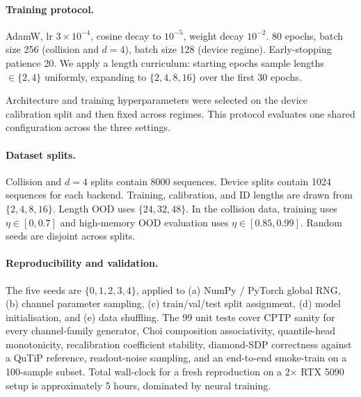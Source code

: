 \documentclass[12pt]{iopart}
\begin{document}
\paragraph*{Training protocol.}
AdamW, lr $3 \times 10^{-4}$, cosine decay to $10^{-5}$, weight decay $10^{-2}$. 80 epochs, batch size 256 (collision and $d{=}4$), batch size 128 (device regime). Early-stopping patience 20. We apply a length curriculum: starting epochs sample lengths $\in \{2, 4\}$ uniformly, expanding to $\{2, 4, 8, 16\}$ over the first 30 epochs.

Architecture and training hyperparameters were selected on the device calibration split and then fixed across regimes. This protocol evaluates one shared configuration across the three settings.

\paragraph*{Dataset splits.}
Collision and $d=4$ splits contain 8000 sequences. Device splits contain 1024 sequences for each backend. Training, calibration, and ID lengths are drawn from $\{2,4,8,16\}$. Length OOD uses $\{24,32,48\}$. In the collision data, training uses $\eta\in[0,0.7]$ and high-memory OOD evaluation uses $\eta\in[0.85,0.99]$. Random seeds are disjoint across splits.

\paragraph*{Reproducibility and validation.}
The five seeds are $\{0, 1, 2, 3, 4\}$, applied to (a) NumPy / PyTorch global RNG, (b) channel parameter sampling, (c) train/val/test split assignment, (d) model initialisation, and (e) data shuffling. The 99 unit tests cover CPTP sanity for every channel-family generator, Choi composition associativity, quantile-head monotonicity, recalibration coefficient stability, diamond-SDP correctness against a QuTiP reference, readout-noise sampling, and an end-to-end smoke-train on a 100-sample subset. Total wall-clock for a fresh reproduction on a 2$\times$ RTX 5090 setup is approximately 5 hours, dominated by neural training.


\clearpage


\end{document}
